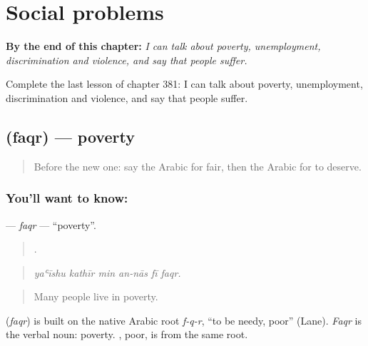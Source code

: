 
\chapter{Social problems}
\label{ch:ar-social-problems}

\begin{chapteropening}
\textbf{By the end of this chapter:} \emph{I can talk about poverty, unemployment, discrimination and violence, and say that people suffer.}

Complete the last lesson of chapter 381: I can talk about poverty, unemployment, discrimination and violence, and say that people suffer.
\end{chapteropening}

\section[\texorpdfstring{\ar{فقر} (faqr)}{فقر (faqr)}]{ (faqr) — poverty}

\label{lesson:AR-C381-faqr}



\begin{quote}
Before the new one: say the Arabic for fair, then the Arabic for to deserve.
\end{quote}

\subsection*{You'll want to know: }
\textbf{} — \emph{faqr} — \textquotedblleft{}poverty\textquotedblright{}.

\begin{quote}
     .
\end{quote}

\begin{quote}
\emph{yaʿīshu kathīr min an-nās fī faqr.}
\end{quote}

\begin{quote}
Many people live in poverty.
\end{quote}

\begin{cousinweb}
\textbf{} (\emph{faqr}) is built on the native Arabic root \emph{f-q-r}, \textquotedblleft{}to be needy, poor\textquotedblright{} (Lane). \emph{Faqr} is the verbal noun: poverty. , poor, is from the same root.
\end{cousinweb}

